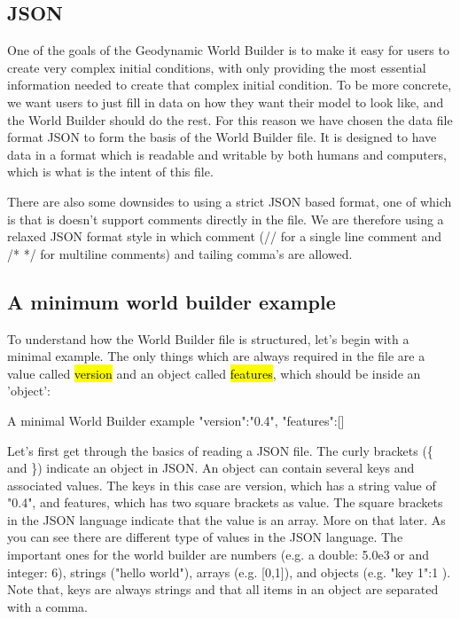 \documentclass{book}
\newcommand{\GWB}{{Geodynamic World Builder}}
\newcommand{\WB}{{World Builder}}
\begin{document}
\subsection{JSON}
One of the goals of the \GWB{} is to make it easy for users to create very complex initial conditions, with only providing the most essential information needed to create that complex initial condition. To be more concrete, we want users to just fill in data on how they want their model to look like, and the \WB{} should do the rest. For this reason we have chosen the data file format JSON to form the basis of the \WB{} file. It is designed to have data in a format which is readable and writable by both humans and computers, which is what is the intent of this file. 
\begin{remark}
There are also some downsides to using a strict JSON based format, one of which is that is doesn't support comments directly in the file. We are therefore using a relaxed JSON format style in which comment (// for a single line comment and /* */ for multiline comments) and tailing comma's are allowed.
\end{remark}
\subsection{A minimum world builder example}
To understand how the \WB{} file is structured, let's begin with a minimal example. The only things which are always required in the file are a value called \hl{version} and an object called \hl{features}, which should be inside an 'object':

\begin{javascriptcode}{A minimal \WB{} example}{}
{
  "version":"0.4",
  "features":[]
}
\end{javascriptcode}

Let's first get through the basics of reading a JSON file. The curly brackets (\{ and \}) indicate an object in JSON. An object can contain several keys and associated values. The keys in this case are version, which has a string value of "0.4", and features, which has two square brackets as value. The square brackets in the JSON language indicate that the value is an array. More on that later. As you can see there are different type of values in the JSON language. The important ones for the world builder are numbers (e.g. a double: 5.0e3 or and integer: 6), strings ("hello world"), arrays (e.g. [0,1]),  and objects (e.g. { "key 1":1 }). Note that, keys are always strings and that all items in an object are separated with a comma.
\end{document}
